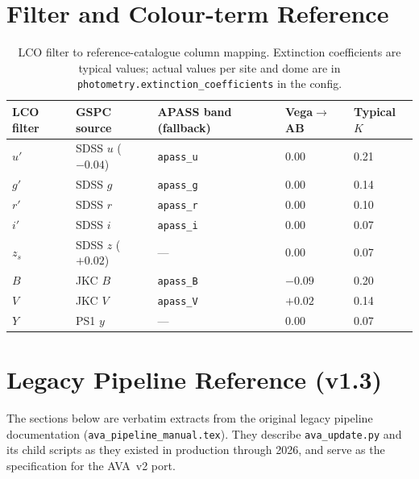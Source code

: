 \documentclass[12pt,a4paper]{article}
\begin{document}
\section{Filter and Colour-term Reference}
\label{app:filters}

\begin{table}[h!]
\centering
\small
\begin{tabular}{lllll}
\toprule
LCO filter & GSPC source & APASS band (fallback) & Vega$\to$AB & Typical $K$ \\
\midrule
$u'$ & SDSS $u$ ($-0.04$) & \texttt{apass\_u} & 0.00 & 0.21 \\
$g'$ & SDSS $g$ & \texttt{apass\_g} & 0.00 & 0.14 \\
$r'$ & SDSS $r$ & \texttt{apass\_r} & 0.00 & 0.10 \\
$i'$ & SDSS $i$ & \texttt{apass\_i} & 0.00 & 0.07 \\
$z_s$ & SDSS $z$ ($+0.02$) & --- & 0.00 & 0.07 \\
$B$ & JKC $B$ & \texttt{apass\_B} & $-0.09$ & 0.20 \\
$V$ & JKC $V$ & \texttt{apass\_V} & $+0.02$ & 0.14 \\
$Y$ & PS1 $y$ & --- & 0.00 & 0.07 \\
\bottomrule
\end{tabular}
\caption{LCO filter to reference-catalogue column mapping.
  Extinction coefficients are typical values; actual values per site and dome
  are in \texttt{photometry.extinction\_\hspace{0pt}coefficients} in the config.}
\end{table}

\section{Legacy Pipeline Reference (v1.3)}
\label{app:legacy}

\begin{notebox}
The sections below are verbatim extracts from the original legacy pipeline
documentation (\texttt{ava\_\hspace{0pt}pipeline\_\hspace{0pt}manual.tex}).  They describe
\texttt{ava\_update.py} and its child scripts as they existed in production
through 2026, and serve as the specification for the AVA~v2 port.
\end{notebox}
\end{document}
